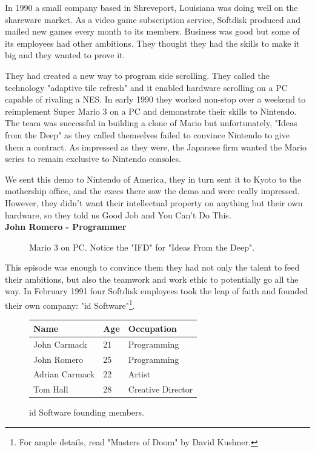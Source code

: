 \documentclass[book.tex]{subfiles}
\begin{document}
In 1990 a small company based in Shreveport, Louisiana was doing well on the shareware market. As a video game subscription service, Softdisk produced and mailed new games every month to its members. Business was good but some of its employees had other ambitions. They thought they had the skills to make it big and they wanted to prove it.\\
\par
They had created a new way to program side scrolling. They called the technology "adaptive tile refresh" and it enabled hardware scrolling on a PC capable of rivaling a NES. In early 1990 they worked non-stop over a weekend to reimplement Super Mario 3 on a PC and demonstrate their skills to Nintendo. The team was successful in building a clone of Mario but unfortunately, "Ideas from the Deep" as they called themselves failed to convince Nintendo to give them a contract. As impressed as they were, the Japanese firm wanted the Mario series to remain exclusive to Nintendo consoles.\\
\par
\begin{fancyquotes}
We sent this demo to Nintendo of America, they in turn sent it to Kyoto to the mothership office, and the execs there saw the demo and were really impressed. However, they didn't want their intellectual property on anything but their own hardware, so they told us Good Job and You Can't Do This\protect\footnotemark.
 \bigskip \\
\textbf{John Romero - Programmer}
 \end{fancyquotes}
 \begin{figure}[H]
\caption{Mario 3 on PC. Notice the "IFD" for "Ideas From the Deep".}
\end{figure}

\par
This episode was enough to convince them they had not only the talent to feed their ambitions, but also the teamwork and work ethic to potentially go all the way. In February 1991 four Softdisk employees took the leap of faith and founded their own company: "id Software"\footnote{For ample details, read "Masters of Doom" by David Kushner.}. 

 
 \begin{figure}[H]
\centering  
\begin{tabularx}{\textwidth}{ X  X  X  }
  \toprule
  \textbf{Name} &  \textbf{Age} & \textbf{Occupation} \\
  \toprule 
   John Carmack & 21 &  Programming\\
   John Romero & 25 &  Programming\\
   Adrian Carmack & 22 &  Artist\\
   Tom Hall & 28 &  Creative Director\\
     \toprule
\end{tabularx}
\caption{id Software founding members.}\label{fig:Id Software team}
\end{figure}
\end{document}
